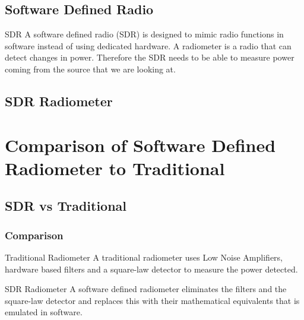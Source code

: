 \documentclass[notes]{beamer}
\begin{document}
\subsection{Software Defined Radio}
\begin{frame}
\begin{block}{SDR}
A software defined radio (SDR) is designed to mimic radio functions in software instead of using dedicated hardware.  A radiometer is a radio that can detect changes in power.  Therefore the SDR needs to be able to measure power coming from the source that we are looking at. 
\end{block}
\end{frame}
\subsection{SDR Radiometer}
\section{Comparison of Software Defined Radiometer to Traditional}
\subsection{SDR vs Traditional}
\begin{frame}
\frametitle{Comparison}
\begin{block}{Traditional Radiometer}
A traditional radiometer uses Low Noise Amplifiers, hardware based filters and a square-law detector to measure the power detected.  
\end{block}

\begin{block}{SDR Radiometer}
A software defined radiometer eliminates the filters and the square-law detector and replaces this with their mathematical equivalents that is emulated in software.   
\end{block}
\end{frame}
\end{document}
